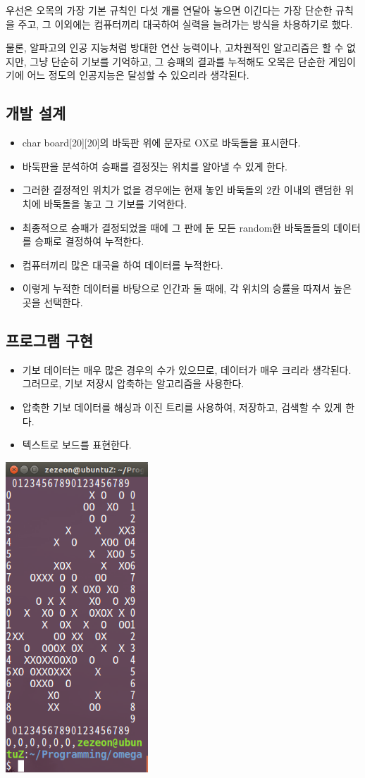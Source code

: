 \documentclass[12pt,a4paper]{report}
\begin{document}
우선은 오목의 가장 기본 규칙인 다섯 개를 연달아 놓으면 이긴다는 가장 단순한 규칙을 주고, 그 이외에는 컴퓨터끼리 대국하여 실력을 늘려가는 방식을 차용하기로 했다.

물론, 알파고의 인공 지능처럼 방대한 연산 능력이나, 고차원적인 알고리즘은 할 수 없지만, 그냥 단순히 기보를 기억하고, 그 승패의 결과를 누적해도 오목은 단순한 게임이기에 어느 정도의 인공지능은 달성할 수 있으리라 생각된다.
\subsection{개발 설계}
\begin{itemize}
\item char board[20][20]의 바둑판 위에 문자로 OX로 바둑돌을 표시한다.
\item 바둑판을 분석하여 승패를 결정짓는 위치를 알아낼 수 있게 한다.
\item 그러한 결정적인 위치가 없을 경우에는 현재 놓인 바둑돌의 2칸 이내의 랜덤한 위치에 바둑돌을 놓고 그 기보를 기억한다.
\item 최종적으로 승패가 결정되었을 때에 그 판에 둔 모든 random한 바둑돌들의 데이터를 승패로 결정하여 누적한다.
\item 컴퓨터끼리 많은 대국을 하여 데이터를 누적한다.
\item 이렇게 누적한 데이터를 바탕으로 인간과 둘 때에, 각 위치의 승률을 따져서 높은 곳을 선택한다.
\end{itemize}
\subsection{프로그램 구현}
\begin{itemize}
\item 기보 데이터는 매우 많은 경우의 수가 있으므로, 데이터가 매우 크리라 생각된다.
그러므로, 기보 저장시 압축하는 알고리즘을 사용한다.
\item 압축한 기보 데이터를 해싱과 이진 트리를 사용하여, 저장하고, 검색할 수 있게 한다.
\item 텍스트로 보드를 표현한다.
\end{itemize}
\includegraphics[width=0.4\textwidth]{b.png}
\end{document}
